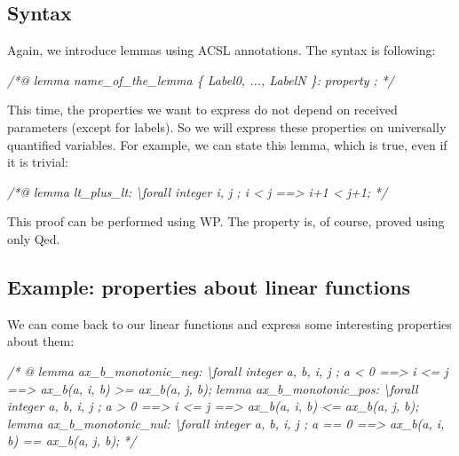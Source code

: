 \documentclass[12pt,francais,]{scrbook}
\newenvironment{Shaded}{}{}
\newcommand{\CommentTok}[1]{\textcolor[rgb]{0.38,0.63,0.69}{\textit{{#1}}}}
\begin{document}
\subsection{Syntax}\label{syntax-2}

Again, we introduce lemmas using ACSL annotations. The syntax is
following:

\begin{footnotesize}\begin{Shaded}
\begin{Highlighting}[]
\CommentTok{/*@}
\CommentTok{  lemma name_of_the_lemma \{ Label0, ..., LabelN \}:}
\CommentTok{    property ;}
\CommentTok{*/}
\end{Highlighting}
\end{Shaded}\end{footnotesize}

This time, the properties we want to express do not depend on received
parameters (except for labels). So we will express these properties on
universally quantified variables. For example, we can state this lemma,
which is true, even if it is trivial:

\begin{footnotesize}\begin{Shaded}
\begin{Highlighting}[]
\CommentTok{/*@}
\CommentTok{  lemma lt_plus_lt:}
\CommentTok{    \textbackslash{}forall integer i, j ; i < j ==> i+1 < j+1;}
\CommentTok{*/}
\end{Highlighting}
\end{Shaded}\end{footnotesize}

This proof can be performed using WP. The property is, of course, proved
using only Qed.

\subsection{Example: properties about linear
functions}\label{example-properties-about-linear-functions}

We can come back to our linear functions and express some interesting
properties about them:

\begin{footnotesize}\begin{Shaded}
\begin{Highlighting}[]
\CommentTok{/* @}
\CommentTok{  lemma ax_b_monotonic_neg:}
\CommentTok{    \textbackslash{}forall integer a, b, i, j ;}
\CommentTok{      a <  0 ==> i <= j ==> ax_b(a, i, b) >= ax_b(a, j, b);}
\CommentTok{  lemma ax_b_monotonic_pos:}
\CommentTok{    \textbackslash{}forall integer a, b, i, j ;}
\CommentTok{      a >  0 ==> i <= j ==> ax_b(a, i, b) <= ax_b(a, j, b);}
\CommentTok{  lemma ax_b_monotonic_nul:}
\CommentTok{    \textbackslash{}forall integer a, b, i, j ;}
\CommentTok{      a == 0 ==> ax_b(a, i, b) == ax_b(a, j, b);}
\CommentTok{*/}
\end{Highlighting}
\end{Shaded}\end{footnotesize}
\end{document}
